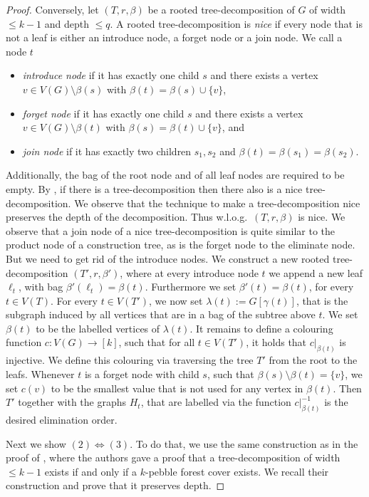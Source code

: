 \documentclass{lmcs}
\theoremstyle{plain}\newtheorem{claim}[thm]{Claim}   %
\begin{document}
\begin{proof}
	Conversely, let $(T,r,\beta)$ be a rooted tree-decomposition of $G$ of width $\leq k-1$ and depth $\leq q$.
	A rooted tree-decomposition is \emph{nice} if every node that is not a leaf is either an introduce node, a forget node or a join node.
	We call a node $t$ 
	\begin{itemize}
		\item \emph{introduce node} if it has exactly one child $s$ and 
		there exists a vertex $v\in V(G) \setminus \beta(s)$ with $\beta(t)=\beta(s)\cup \{v\} $,
		\item \emph{forget node} if it has exactly one child $s$ and there exists a vertex $v\in V(G) \setminus \beta(t)$ with $\beta(s)=\beta(t)\cup \{v\}$, and 
		\item \emph{join node} if it has exactly two children $s_1,s_2$ and $\beta(t)=\beta(s_1)=\beta(s_2)$.
	\end{itemize}
	Additionally, the bag of the root node and of all leaf nodes are required to be empty.
	By \cite{Bodlaender_partial_1998}, if there is a tree-decomposition then there also is a nice tree-decomposition.
	We observe that the technique to make a tree-decomposition nice preserves the depth of the decomposition.
	Thus w.l.o.g.\ $(T,r,\beta)$ is nice.
	We observe that a join node of a nice tree-decomposition is quite similar to the product node of a construction tree, as is the forget node to the eliminate node.
	But we need to get rid of the introduce nodes.
	We construct a new rooted tree-decomposition $(T',r,\beta')$, where at every introduce node $t$ we append a new leaf $\ell_t$, with bag $\beta'(\ell_t)=\beta(t)$.
	Furthermore we set $\beta'(t)=\beta(t)$, for every $t\in V(T)$.
	For every $t\in V(T')$, we now set $\lambda(t):=G[\gamma(t)]$, that is the subgraph induced by all vertices that are in a bag of the subtree above $t$.
	We set $\beta(t)$ to be the labelled vertices of $\lambda(t)$.
	It remains to define a colouring function $c\colon V(G)\rightarrow [k]$, such that for all $t\in V(T')$, it holds that $c|_{\beta(t)}$ is injective.
	We define this colouring via traversing the tree $T'$ from the root to the leafs.
	Whenever $t$ is a forget node with child $s$, such that $\beta(s)\setminus\beta(t)=\{v\}$, we set $c(v)$ to be the smallest value that is not used for any vertex in $\beta(t)$.
	Then $T'$ together with the graphs $H_t$, that are labelled via the function $c|_{\beta(t)}^{-1}$ is the desired elimination order.
	
	Next we show $(2)\Leftrightarrow (3)$.
	To do that, we use the same construction as in the proof of \cite[Theorem~19]{Abramsky_relating_2021}, where the authors gave a proof that a tree-decomposition of width $\leq k-1$ exists if and only if a $k$-pebble forest cover exists.
	We recall their construction and prove that it preserves depth.
	

\end{proof}
\end{document}
